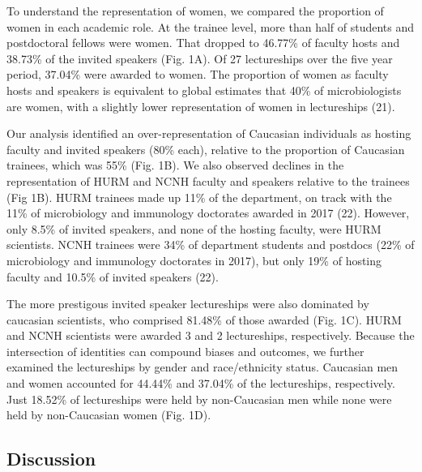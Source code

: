 \documentclass[10pt,]{article}
\begin{document}
To understand the representation of women, we compared the proportion of
women in each academic role. At the trainee level, more than half of
students and postdoctoral fellows were women. That dropped to 46.77\% of
faculty hosts and 38.73\% of the invited speakers (Fig. 1A). Of 27
lectureships over the five year period, 37.04\% were awarded to women.
The proportion of women as faculty hosts and speakers is equivalent to
global estimates that 40\% of microbiologists are women, with a slightly
lower representation of women in lectureships (21).

Our analysis identified an over-representation of Caucasian individuals
as hosting faculty and invited speakers (80\% each), relative to the
proportion of Caucasian trainees, which was 55\% (Fig. 1B). We also
observed declines in the representation of HURM and NCNH faculty and
speakers relative to the trainees (Fig 1B). HURM trainees made up 11\%
of the department, on track with the 11\% of microbiology and immunology
doctorates awarded in 2017 (22). However, only 8.5\% of invited
speakers, and none of the hosting faculty, were HURM scientists. NCNH
trainees were 34\% of department students and postdocs (22\% of
microbiology and immunology doctorates in 2017), but only 19\% of
hosting faculty and 10.5\% of invited speakers (22).

The more prestigous invited speaker lectureships were also dominated by
caucasian scientists, who comprised 81.48\% of those awarded (Fig. 1C).
HURM and NCNH scientists were awarded 3 and 2 lectureships,
respectively. Because the intersection of identities can compound biases
and outcomes, we further examined the lectureships by gender and
race/ethnicity status. Caucasian men and women accounted for 44.44\% and
37.04\% of the lectureships, respectively. Just 18.52\% of lectureships
were held by non-Caucasian men while none were held by non-Caucasian
women (Fig. 1D).

\subsection{Discussion}\label{discussion}
\end{document}
